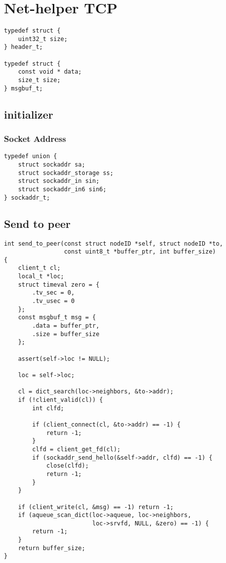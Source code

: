 \section{Net-helper TCP}

\begin{lstlisting}
typedef struct {
    uint32_t size;
} header_t;

typedef struct {
    const void * data;
    size_t size;
} msgbuf_t;
\end{lstlisting}

\subsection{initializer}

\subsubsection{Socket Address}
\label{apx-nh-init}
\begin{lstlisting}
typedef union {
    struct sockaddr sa;
    struct sockaddr_storage ss;
    struct sockaddr_in sin;
    struct sockaddr_in6 sin6;
} sockaddr_t;
\end{lstlisting}

\subsection{Send to peer}
\label{nh-send2peer}

\begin{lstlisting}
int send_to_peer(const struct nodeID *self, struct nodeID *to,
                 const uint8_t *buffer_ptr, int buffer_size)
{
    client_t cl;
    local_t *loc;
    struct timeval zero = {
        .tv_sec = 0,
        .tv_usec = 0
    };
    const msgbuf_t msg = {
        .data = buffer_ptr,
        .size = buffer_size
    };

    assert(self->loc != NULL);

    loc = self->loc;

    cl = dict_search(loc->neighbors, &to->addr);
    if (!client_valid(cl)) {
        int clfd;

        if (client_connect(cl, &to->addr) == -1) {
            return -1;
        }
        clfd = client_get_fd(cl);
        if (sockaddr_send_hello(&self->addr, clfd) == -1) {
            close(clfd);
            return -1;
        }
    }

    if (client_write(cl, &msg) == -1) return -1;
    if (aqueue_scan_dict(loc->aqueue, loc->neighbors,
                         loc->srvfd, NULL, &zero) == -1) {
        return -1;
    }
    return buffer_size;
}
\end{lstlisting}

